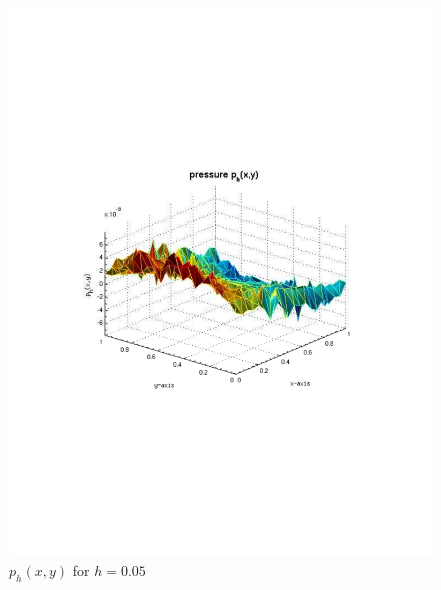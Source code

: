 \documentclass[12pt]{article}
\begin{document}
                \begin{figure}[htb]
                    \begin{center}
                \includegraphics[scale=0.50]{./../files/box/3p.pdf}
                \caption{$p_h(x,y)$ for $h = 0.05$}
            \end{center}
            \end{figure}
\end{document}
